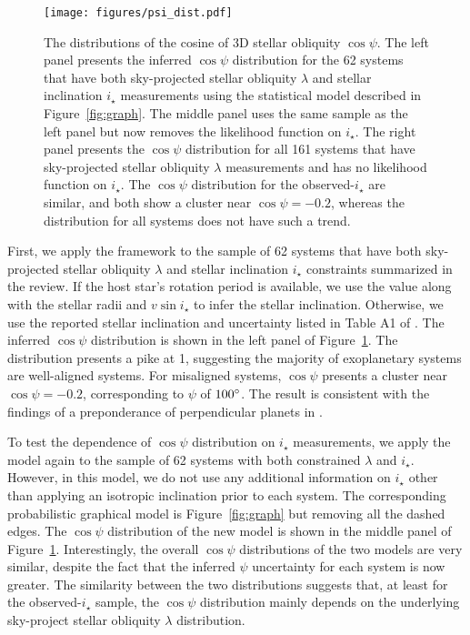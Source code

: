 \documentclass[twocolumn,times]{aastex631}
\newcommand{\numistar}{62\xspace}
\newcommand{\numall}{161\xspace}
\begin{document}
\begin{figure}[ht!]
    \begin{centering}
        \texttt{[image: figures/psi\_dist.pdf]}
        \caption{The distributions of the cosine of 3D stellar obliquity $\cos{\psi}$. The left panel presents the inferred $\cos{\psi}$ distribution for the \numistar systems that have both sky-projected stellar obliquity $\lambda$ and stellar inclination $i_\star$ measurements using the statistical model described in Figure~\ref{fig:graph}. The middle panel uses the same sample as the left panel but now removes the likelihood function on $i_\star$. The right panel presents the $\cos{\psi}$ distribution for all \numall systems that have sky-projected stellar obliquity $\lambda$ measurements and has no likelihood function on $i_\star$. The $\cos{\psi}$ distribution for the observed-$i_\star$ are similar, and both show a cluster near $\cos{\psi} = -0.2$, whereas the distribution for all systems does not have such a trend.}
        \label{fig:psi_dist}
    \end{centering}
\end{figure}

First, we apply the framework to the sample of \numistar systems that have both sky-projected stellar obliquity $\lambda$ and stellar inclination $i_\star$ constraints summarized in the \cite{Albrecht22} review. If the host star's rotation period is available, we use the value along with the stellar radii and $v\sin{i_\star}$ to infer the stellar inclination. Otherwise, we use the reported stellar inclination and uncertainty listed in Table A1 of \cite{Albrecht22}.
The inferred $\cos{\psi}$ distribution is shown in the left panel of Figure~\ref{fig:psi_dist}. The distribution presents a pike at 1, suggesting the majority of exoplanetary systems are well-aligned systems. For misaligned systems, $\cos{\psi}$ presents a cluster near $\cos{\psi} = -0.2$, corresponding to $\psi$ of $100\mbox{$^\circ$}$. The result is consistent with the findings of a preponderance of perpendicular planets in \cite{Albrecht21}.

To test the dependence of $\cos{\psi}$ distribution on $i_\star$ measurements, we apply the model again to the sample of \numistar systems with both constrained $\lambda$ and $i_\star$. However, in this model, we do not use any additional information on $i_\star$ other than applying an isotropic inclination prior to each system. The corresponding probabilistic graphical model is Figure~\ref{fig:graph} but removing all the dashed edges.
The $\cos{\psi}$ distribution of the new model is shown in the middle panel of Figure~\ref{fig:psi_dist}. Interestingly, the overall $\cos{\psi}$ distributions of the two models are very similar, despite the fact that the inferred $\psi$ uncertainty for each system is now greater.
The similarity between the two distributions suggests that, at least for the observed-$i_\star$ sample, the $\cos{\psi}$ distribution mainly depends on the underlying sky-project stellar obliquity $\lambda$ distribution.
\end{document}
